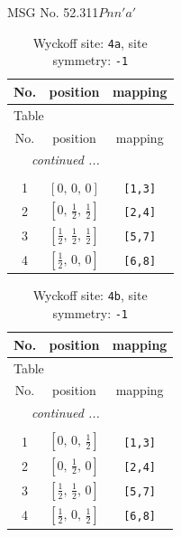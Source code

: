 \documentclass[fleqn,8pt]{jsarticle}
\begin{document}
\setcounter{MaxMatrixCols}{32}

\renewcommand{\tablename}{Table~}
\renewcommand{\figurename}{Figure~}
\begin{center}
\LARGE
MSG No. 52.311\quad$Pnn'a'$
\end{center}
\renewcommand{\arraystretch}{1.2}
\begin{longtable}{ccc}
\caption{Wyckoff site: {\tt 4a}, site symmetry: {\tt -1}}
 \\
 \hline \hline
No. & position & mapping \\ \hline \endfirsthead

\multicolumn{2}{l}{\tablename\ \thetable{}} \\
 \hline \hline
No. & position & mapping \\ \hline \endhead

 \hline \hline
\multicolumn{2}{r}{\footnotesize\it continued ...} \\ \endfoot

 \hline \hline
\multicolumn{2}{r}{} \\ \endlastfoot

1 & $\left[ 0,\, 0,\, 0 \right]$ & {\tt [1,3]} \\ \hline
2 & $\left[ 0,\, \frac{1}{2},\, \frac{1}{2} \right]$ & {\tt [2,4]} \\ \hline
3 & $\left[ \frac{1}{2},\, \frac{1}{2},\, \frac{1}{2} \right]$ & {\tt [5,7]} \\ \hline
4 & $\left[ \frac{1}{2},\, 0,\, 0 \right]$ & {\tt [6,8]} \\
\end{longtable}
\renewcommand{\arraystretch}{1.2}
\begin{longtable}{ccc}
\caption{Wyckoff site: {\tt 4b}, site symmetry: {\tt -1}}
 \\
 \hline \hline
No. & position & mapping \\ \hline \endfirsthead

\multicolumn{2}{l}{\tablename\ \thetable{}} \\
 \hline \hline
No. & position & mapping \\ \hline \endhead

 \hline \hline
\multicolumn{2}{r}{\footnotesize\it continued ...} \\ \endfoot

 \hline \hline
\multicolumn{2}{r}{} \\ \endlastfoot

1 & $\left[ 0,\, 0,\, \frac{1}{2} \right]$ & {\tt [1,3]} \\ \hline
2 & $\left[ 0,\, \frac{1}{2},\, 0 \right]$ & {\tt [2,4]} \\ \hline
3 & $\left[ \frac{1}{2},\, \frac{1}{2},\, 0 \right]$ & {\tt [5,7]} \\ \hline
4 & $\left[ \frac{1}{2},\, 0,\, \frac{1}{2} \right]$ & {\tt [6,8]} \\
\end{longtable}
\end{document}
